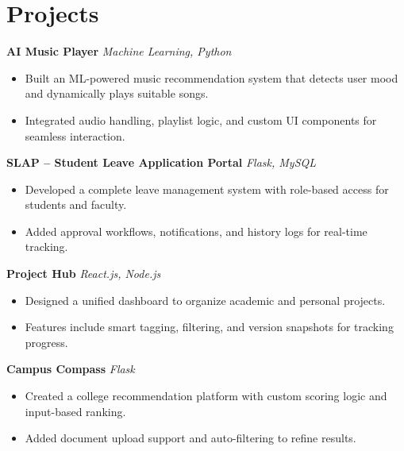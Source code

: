 \documentclass[a4paper,12pt]{article}
\begin{document}
\section*{Projects}

\textbf{AI Music Player}  
\textit{Machine Learning, Python}
\begin{itemize}
    \item Built an ML-powered music recommendation system that detects user mood and dynamically plays suitable songs.
    \item Integrated audio handling, playlist logic, and custom UI components for seamless interaction.
\end{itemize}

\textbf{SLAP – Student Leave Application Portal}  
\textit{Flask, MySQL}
\begin{itemize}
    \item Developed a complete leave management system with role-based access for students and faculty.
    \item Added approval workflows, notifications, and history logs for real-time tracking.
\end{itemize}

\textbf{Project Hub}  
\textit{React.js, Node.js}
\begin{itemize}
    \item Designed a unified dashboard to organize academic and personal projects.
    \item Features include smart tagging, filtering, and version snapshots for tracking progress.
\end{itemize}

\textbf{Campus Compass}  
\textit{Flask}
\begin{itemize}
    \item Created a college recommendation platform with custom scoring logic and input-based ranking.
    \item Added document upload support and auto-filtering to refine results.
\end{itemize}
\end{document}
